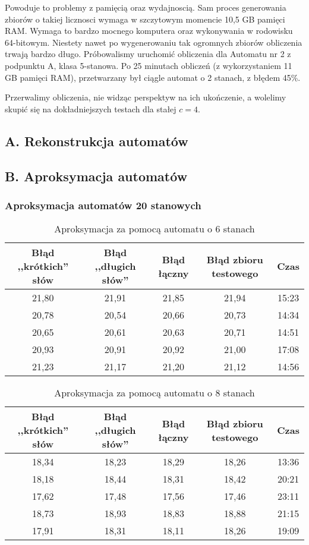 \documentclass{../llncs_template_final/llncs}
\begin{document}
Powoduje to problemy z pamięcią oraz wydajnoscią. Sam proces generowania zbiorów o takiej licznosci wymaga w szczytowym momencie 10,5 GB pamięci RAM. Wymaga to bardzo mocnego komputera oraz wykonywania w rodowisku 64-bitowym.
Niestety nawet po wygenerowaniu tak ogromnych zbiorów obliczenia trwają bardzo długo. Próbowalismy uruchomić obliczenia dla Automatu nr 2 z podpunktu A, klasa 5-stanowa. Po 25 minutach obliczeń (z wykorzystaniem 11 GB pamięci RAM), przetwarzany był ciągle automat o 2 stanach, z błędem 45\%. 

Przerwalimy obliczenia, nie widząc perspektyw na ich ukończenie, a wolelimy skupić się na dokładniejszych testach dla stałej $c = 4$.

\subsection{A. Rekonstrukcja automatów}

\newpage

\subsection{B. Aproksymacja automatów} 

\subsubsection{Aproksymacja automatów 20 stanowych} 

\begin{table}[] 
\centering 
\caption{Aproksymacja za pomocą automatu o 6 stanach}  
\begin{tabular}{| c | c | c | c | c |} 
\hline Błąd ,,krótkich'' słów & Błąd ,,długich słów'' & Błąd łączny & Błąd zbioru testowego & Czas \\ [0.5ex] 
\hline 21,80 & 21,91 & 21,85 & 21,94 & 15:23 \\ 
\hline 20,78 & 20,54 & 20,66 & 20,73 & 14:34 \\ 
\hline 20,65 & 20,61 & 20,63 & 20,71 & 14:51 \\ 
\hline 20,93 & 20,91 & 20,92 & 21,00 & 17:08 \\ 
\hline 21,23 & 21,17 & 21,20 & 21,12 & 14:56 \\ 
\hline 
\end{tabular} 
\end{table} 

\begin{table}[] 
\centering 
\caption{Aproksymacja za pomocą automatu o 8 stanach} 
\begin{tabular}{| c | c | c | c | c |} 
\hline Błąd ,,krótkich'' słów & Błąd ,,długich słów'' & Błąd łączny & Błąd zbioru testowego & Czas \\ [0.5ex] 
\hline 18,34 & 18,23 & 18,29 & 18,26 & 13:36 \\ 
\hline 18,18 & 18,44 & 18,31 & 18,42 & 20:21 \\ 
\hline 17,62 & 17,48 & 17,56 & 17,46 & 23:11 \\ 
\hline 18,73 & 18,93 & 18,83 & 18,88 & 21:15 \\ 
\hline 17,91 & 18,31 & 18,11 & 18,26 & 19:09 \\ 
\hline 
\end{tabular} 
\end{table}
\end{document}
